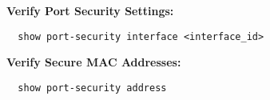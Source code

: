 \documentclass[../EngineeringJournal_CDavis.tex]{subfiles}
\begin{document}

\hspace{0.2cm}
\begin{tcolorbox}[width=6.3in]
  \scriptsize 
  {\bf{Verify Port Security Settings:}}
  \begin{verbatim}
  show port-security interface <interface_id>
  \end{verbatim}
  {\bf{Verify Secure MAC Addresses:}}
  \begin{verbatim}
  show port-security address
  \end{verbatim}
\end{tcolorbox}
\hspace{0.2cm}
\normalsize  
\end{document}
